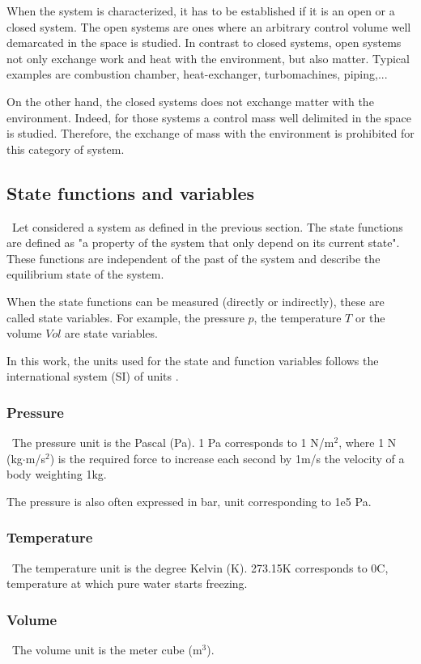 When the system is characterized, it has to be established if it is an open or a closed system.
The open systems are ones where an arbitrary control volume well demarcated in the space is studied. In contrast to closed systems, open systems not only exchange work and heat with the environment, but also matter. Typical examples are combustion chamber, heat-exchanger, turbomachines, piping,...

On the other hand, the closed systems does not exchange matter with the environment. Indeed, 
for those systems a control mass well delimited in the space is studied. Therefore, the exchange of mass with the environment is prohibited for this category of system. 

\subsection{State functions and variables}\label{sect:C2_State}
\quad\, Let considered a system as defined in the previous section. The state functions are defined as "a property of the system that only depend on its current state". These functions are independent of the past of the system and describe the equilibrium state of the system.

When the state functions can be measured (directly or indirectly), these are called state variables. For example, the pressure $p$, the temperature $T$ or the volume $Vol$ are state variables.


In this work, the units used for the state and function variables follows the international system (SI) of units \cite{Nist}. 
\subsubsection{Pressure}
\quad\, The pressure unit is the Pascal (Pa). 1 Pa corresponds to 1 N/m$^2$, where 1 N (kg$\cdot$m/s$^2$) is the required force to increase each second by 1m/s the velocity of a body weighting 1kg.

The pressure is also often expressed in bar, unit corresponding to 1e5 Pa.

\subsubsection{Temperature}
\quad\, The temperature unit is the degree Kelvin (K). 273.15\degree K corresponds to 0\degree C, temperature at which pure water starts freezing.

\subsubsection{Volume}
\quad\, The volume unit is the meter cube (m$^3$).

